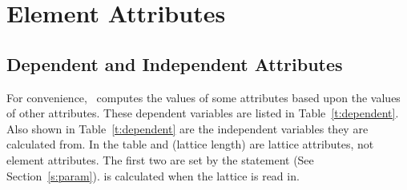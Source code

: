 \chapter {Element Attributes}
\label{c:attrib}

\section{Dependent and Independent Attributes} 
\label{s:depend} 

For convenience, \bmad\ computes the values of some attributes based
upon the values of other attributes. These dependent variables are
listed in Table~\ref{t:dependent}. Also shown in
Table~\ref{t:dependent} are the independent variables they are
calculated from.  In the table  and  (lattice
length) are lattice attributes, not element attributes. The first two
are set by the  statement (See
Section~\ref{s:param}).  is calculated when the
lattice is read in.

\begin{table}[h]
\caption[Table of dependent variables.]{Table of dependent variables and 
  the independent variables 
they are calculated from.}
\label{t:dependent}
\end{table}

